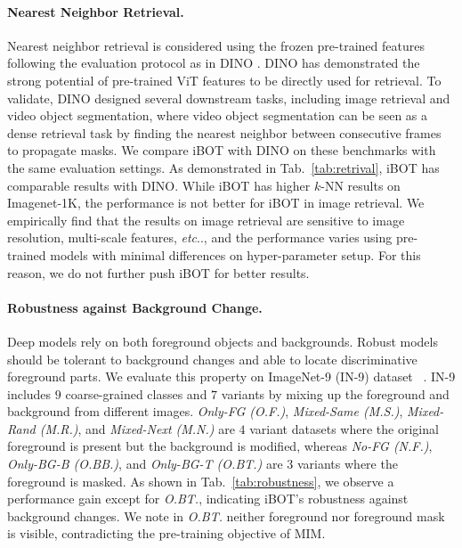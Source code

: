 \documentclass{article} %
\makeatletter
\def\ourmethod{{iBOT}\xspace}
\DeclareRobustCommand\onedot{\futurelet\@let@token\@onedot}
\def\@onedot{\ifx\@let@token.\else.\null\fi\xspace}
\def\etc{\emph{etc}\onedot} \def\vs{\emph{vs}\onedot}
\makeatother
\begin{document}
\paragraph{Nearest Neighbor Retrieval.} 
Nearest neighbor retrieval is considered using the frozen pre-trained features following the evaluation protocol as in DINO \citep{dino}. 
DINO has demonstrated the strong potential of pre-trained ViT features to be directly used for retrieval. To validate, DINO designed several downstream tasks, including image retrieval and video object segmentation, where video object segmentation can be seen as a dense retrieval task by finding the nearest neighbor between consecutive frames to propagate masks.
We compare \ourmethod with DINO on these benchmarks with the same evaluation settings. 
As demonstrated in Tab.~\ref{tab:retrival}, \ourmethod has comparable results with DINO. While \ourmethod has higher $k$-NN results on Imagenet-1K, the performance is not better for \ourmethod in image retrieval. We empirically find that the results on image retrieval are sensitive to image resolution, multi-scale features, \etc, and the performance varies using pre-trained models with minimal differences on hyper-parameter setup. For this reason, we do not further push \ourmethod for better results.

\paragraph{Robustness against Background Change.} 
Deep models rely on both foreground objects and backgrounds. Robust models should be tolerant to background changes and able to locate discriminative foreground parts.
We evaluate this property on ImageNet-9 (IN-9) dataset~ \citep{bgchallenge}. IN-9 includes $9$ coarse-grained classes and $7$ variants by mixing up the foreground and background from different images. 
\textit{Only-FG (O.F.)}, \textit{Mixed-Same (M.S.)}, \textit{Mixed-Rand (M.R.)}, and \textit{Mixed-Next (M.N.)} are $4$ variant datasets where the original foreground is present but the background is modified, whereas \textit{No-FG (N.F.)}, \textit{Only-BG-B (O.BB.)}, and \textit{Only-BG-T (O.BT.)} are $3$ variants where the foreground is masked.
As shown in Tab.~\ref{tab:robustness}, we observe a performance gain except for \textit{O.BT.}, indicating \ourmethod's robustness against background changes. We note in \textit{O.BT.} neither foreground nor foreground mask is visible, contradicting the pre-training objective of MIM.
\end{document}
